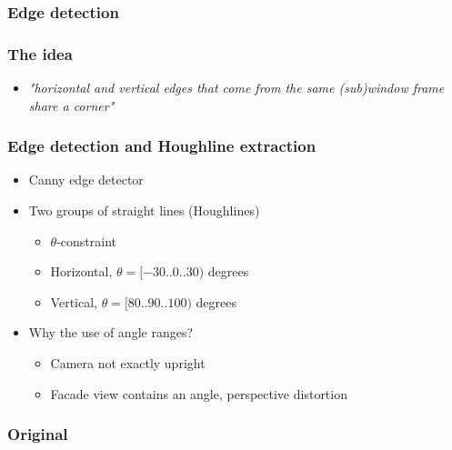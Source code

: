 \documentclass{beamer}
\begin{document}
\frame
{
	\frametitle{Edge detection}
}



\frame
{
	\frametitle{The idea}
	\begin{itemize}
	\item <+-| alert@+> \emph{"horizontal and vertical edges that come from the same (sub)window frame share a corner"}
	\end{itemize}
}


\frame
{
	\frametitle{Edge detection and Houghline extraction}
	\begin{itemize}
	\item <+-| alert@+> Canny edge detector
	\item <+-| alert@+> Two groups of straight lines (Houghlines)
	\begin{itemize}
		\item $\theta$-constraint
		\item <+-| alert@+> Horizontal, $\theta = [-30..0..30)$ degrees
		\item <+-| alert@+> Vertical, $\theta = [80..90..100)$ degrees
	\end{itemize}
	\item <+-| alert@+> Why the use of angle ranges?
	\begin{itemize}
		\item <+-| alert@+> Camera not exactly upright
		\item <+-| alert@+> Facade view contains an angle, perspective distortion 
	\end{itemize}
	\end{itemize}

}

\frame
{
	\frametitle{Original}
}
\end{document}
